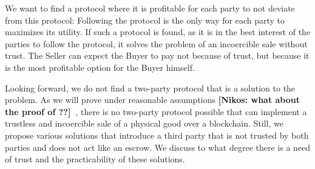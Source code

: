 \documentclass{cacthesis}
\newcommand{\authnote}[3]{{ \footnotesize \textbf{#1[#2: #3]~}}}
\newcommand{\niknote}[1]{\authnote{\color{red}}{Nikos}{#1}}
\begin{document}

 We want to find a protocol where it is profitable for each party to not deviate from this protocol: Following the protocol is the only way for each party to maximizes its utility.
If such a protocol is found, as it is in the best interest of the parties to follow the protocol, it solves the problem of an incoercible sale without trust. The Seller can expect the Buyer to pay not because of trust, but because it is the most profitable option for the Buyer himself. \newline 

Looking forward, we do not find a two-party protocol that is a solution to the problem. As we will prove under reasonable assumptions \niknote{what about the proof of \cite{goharshady_irrationality_2021}??}, there is no two-party protocol possible that can implement a trustless and incoercible sale of a physical good over a blockchain. Still, we propose various solutions that introduce a third party that is not trusted by both parties and does not act like an escrow. We discuss to what degree there is a need of trust and the practicability of these solutions.  \newline


	
\end{document}
